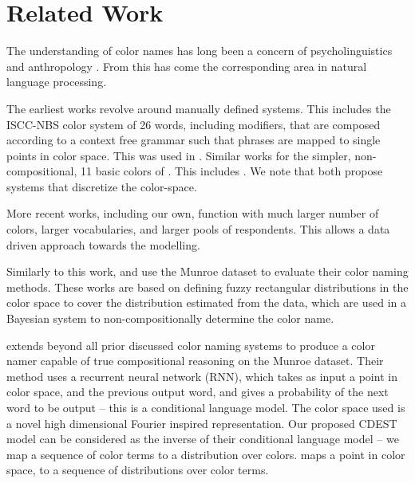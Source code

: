 \documentclass[11pt,letterpaper, twocolumn]{article}
\newcommand{\parencite}{\citep}
\newcommand{\textcite}{\cite}
\begin{document}
\section{Related Work}\label{sec:related-work}

The understanding of color names has long been a concern of psycholinguistics and anthropology  \parencite{berlin1969basic,heider1972universals,HEIDER1972337,mylonas2015use}.
From this has come the corresponding area in natural language processing.

The earliest works revolve around manually defined systems.
This includes the ISCC-NBS color system \parencite{kelly1955iscc} of 26 words, including modifiers, that are composed according to a context free grammar such that phrases are mapped to single points in color space.
This was used in \textcite{Berk:1982:HFS:358589.358606, conway1992experimental, mojsilovic2005computational}.
Similar works for the simpler, non-compositional, 11 basic colors of \textcite{berlin1969basic}.
This includes \textcite{ele1994computational,menegaz2007discrete,van2009learning}.
We note that \textcite{menegaz2007discrete,van2009learning} both propose systems that discretize the color-space.


More recent works, including our own, function with much larger number of colors, larger vocabularies, and larger pools of respondents.
This allows a data driven approach towards the modelling.

Similarly to this work, \textcite{mcmahan2015bayesian} and \textcite{meomcmahanstone:color} use the Munroe dataset to evaluate their color naming methods.
These works are based on defining fuzzy rectangular distributions in the color space to cover the distribution estimated from the data, which are used in a Bayesian system to non-compositionally determine the color name.


\textcite{2016arXiv160603821M} extends beyond all prior discussed color naming systems to produce a color namer capable of true compositional reasoning on the Munroe dataset.
Their method uses a recurrent neural network (RNN), which takes as input a point in color space, and the previous output word, and gives a probability of the next word to be output -- this is a conditional language model.
The color space used is a novel high dimensional Fourier inspired representation.
Our proposed CDEST model can be considered as the inverse of their conditional language model -- we map a sequence of color terms to a distribution over colors.
\textcite{2016arXiv160603821M} maps a point in color space, to a sequence of distributions over color terms.
\end{document}
